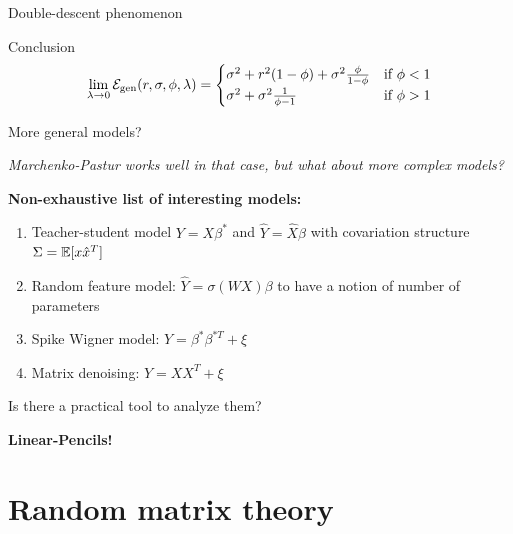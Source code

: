 \documentclass[10pt]{beamer}
\begin{document}
\begin{frame}{Double-descent phenomenon}
  \begin{alertblock}{Conclusion \cite{belkin2020two,Hastie-Montanari-2019}}
  \begin{equation*}
    \lim_{\lambda \to 0}\mathcal E_{\text{gen}}(r,\sigma,\phi,\lambda) = \begin{cases}
      \sigma^2 + r^2 (1-\phi) + \sigma^2 \frac{ \phi}{1 - \phi} & \text{if } \phi < 1   \\
      \sigma^2 + \sigma^2 \frac{1}{\phi - 1} & \text{if } \phi > 1
  \end{cases}
  \end{equation*}
  \end{alertblock}
\end{frame}




\begin{frame}{More general models?}

  \emph{Marchenko-Pastur works well in that case, but what about more complex models?}

  \textbf{Non-exhaustive list of interesting models:}

  \begin{enumerate}
    \item Teacher-student model $Y = X \beta^*$ and $\hat Y = \hat X \beta$ with covariation structure $\Sigma = \mathbb E[ x \hat x^T]$
    \item Random feature model: $\hat Y = \sigma(WX) \beta$ to have a notion of number of parameters
    \item Spike Wigner model: $Y = \beta^{*} \beta^{*T} + \xi$ 
    \item Matrix denoising: $Y = XX^T + \xi$
  \end{enumerate}

  \vspace*{0.3cm}

  \begin{block}{Is there a practical tool to analyze them?}
    \begin{center}
      \textbf{Linear-Pencils!}
    \end{center}
  \end{block}
\end{frame}

\section{Random matrix theory}
\end{document}
